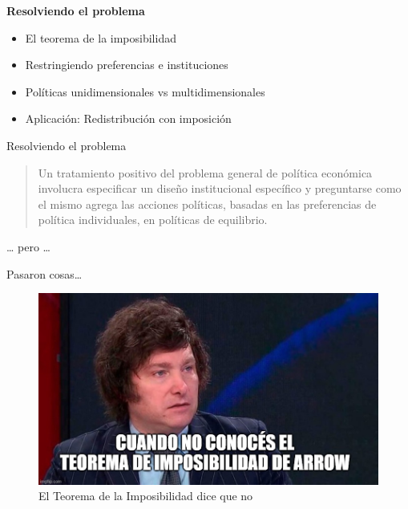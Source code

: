 \documentclass[
  ignorenonframetext,
]{beamer}
\providecommand{\tightlist}{%
  \setlength{\itemsep}{0pt}\setlength{\parskip}{0pt}}\usepackage{longtable,booktabs,array}
\begin{document}
\begin{frame}{\textbf{Resolviendo el problema}}
\protect\hypertarget{resolviendo-el-problema}{}
\begin{itemize}
\tightlist
\item
  El teorema de la imposibilidad
\item
  Restringiendo preferencias e instituciones
\item
  Políticas unidimensionales vs multidimensionales
\item
  Aplicación: Redistribución con imposición
\end{itemize}

\begin{block}{Resolviendo el problema}
\protect\hypertarget{resolviendo-el-problema-1}{}
\begin{quote}
Un tratamiento positivo del problema general de política económica
involucra especificar un diseño institucional específico y preguntarse
como el mismo agrega las acciones políticas, basadas en las preferencias
de política individuales, en políticas de equilibrio.
\end{quote}

\ldots{} pero \ldots{}
\end{block}

\begin{block}{Pasaron cosas\ldots{}}
\protect\hypertarget{pasaron-cosas}{}
\begin{figure}

{\centering \includegraphics{../epol/fig/fig-02-004.jpg}

}

\caption{El Teorema de la Imposibilidad dice que no}

\end{figure}
\end{block}


\end{frame}
\end{document}
